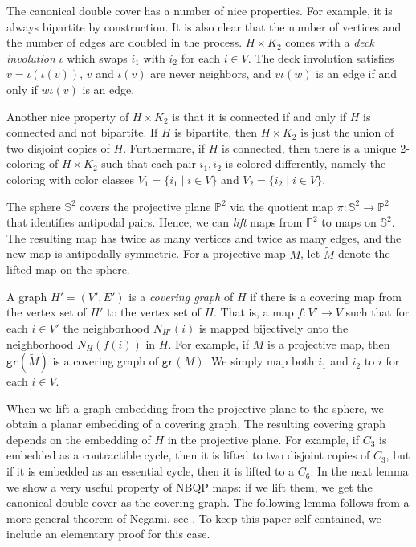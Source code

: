 \documentclass[10pt,a4paper]{article}
\newcommand{\Pb}[0]{\mathbb{P}}
\newcommand{\Sb}[0]{\mathbb{S}}
\newcommand{\gr}{\mathtt{gr}}
\begin{document}
The canonical double cover has a number of nice properties. For example, it is always bipartite by construction. It is also clear that the number of vertices and the number of edges are doubled in the process.  $H\times K_2$ comes with a \emph{deck involution} $\iota$ which swaps $i_1$ with $i_2$ for each $i\in V$. The deck involution satisfies $v=\iota(\iota(v))$, $v$ and $\iota(v)$ are never neighbors, and $v\iota(w)$ is an edge if and only if $w\iota(v)$ is an edge.





Another nice property of $ H\times K_2$ is that it is connected if and only if $H$ is connected and not bipartite. If $H$ is bipartite, then  $H\times K_2$ is just the union of two disjoint copies of $H$. Furthermore, if $H$ is connected, then there is a unique 2-coloring of $H\times K_2$ such that each pair $i_1,i_2$ is colored differently, namely the coloring with color classes $V_1=\{i_1\mid i\in V\}$ and $V_2=\{i_2\mid i\in V\}$.  


The sphere $\Sb^2$ covers the projective plane $\Pb^2$ via the quotient map $\pi:\Sb^2\to\Pb^2$ that identifies antipodal pairs. Hence, we can \emph{lift} maps from $\Pb^2$ to maps on $\Sb^2$. The resulting map has twice as many vertices and twice as many edges, and the new map is antipodally symmetric. For a projective map $M$, let $\widetilde M$ denote the lifted map on the sphere.

A graph $H'=(V',E')$ is a \emph{covering graph} of $H$ if there is a covering map from the vertex set of $H'$ to the vertex set of $H$. That is, a map $f:V'\rightarrow V$ such that for each $i\in V'$ the neighborhood $N_{H'}(i)$ is mapped bijectively onto the neighborhood $N_{H}(f(i))$ in $H$. For example, if $M$ is a projective map, then $\gr(\widetilde M)$ is a covering graph of $\gr(M)$. We simply map both $i_1$ and $i_2$ to $i$ for each $i\in V$.

When we lift a graph embedding from the projective plane to the sphere, we obtain a planar embedding of a covering graph. The resulting covering graph depends on the embedding of $H$ in the projective plane. For example, if $C_3$ is embedded as a contractible cycle, then it is lifted to two disjoint copies of $C_3$, but if it is embedded as an essential cycle, then it is lifted to a $C_6$. In the next lemma we show a very useful property of NBQP maps: if we lift them, we get the canonical double cover as the covering graph. The following lemma follows from a more general theorem of Negami, see \cite{NE92}. To keep this paper self-contained, we include an elementary proof for this case. 
\end{document}
